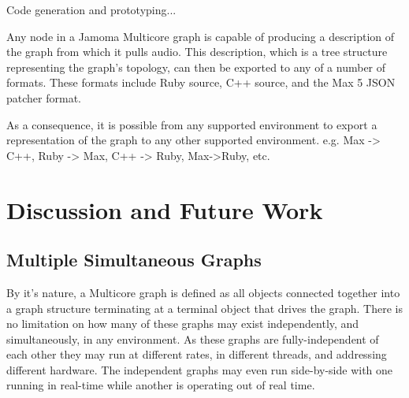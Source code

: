 \documentclass[twoside,a4paper]{article}
\begin{document}
Code generation and prototyping...

Any node in a Jamoma Multicore graph is capable of producing a description of the graph from which it pulls audio.  This description, which is a tree structure representing the graph's topology, can then be exported to any of a number of formats.  These formats include Ruby source, C++ source, and the Max 5 JSON patcher format.

As a consequence, it is possible from any supported environment to export a representation of the graph to any other supported environment.  e.g. Max -> C++, Ruby -> Max, C++ -> Ruby, Max->Ruby, etc.






\section{Discussion and Future Work} %

\subsection{Multiple Simultaneous Graphs} %

By it's nature, a Multicore graph is defined as all objects connected together into a graph structure terminating at a terminal object that drives the graph.  There is no limitation on how many of these graphs may exist independently, and simultaneously, in any environment.  As these graphs are fully-independent of each other they may run at different rates, in different threads, and addressing different hardware.  The independent graphs may even run side-by-side with one running in real-time while another is operating out of real time.

\end{document}
